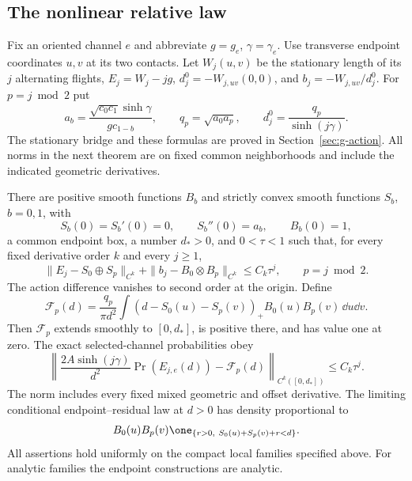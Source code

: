 \subsection{The nonlinear relative law}
Fix an oriented channel $e$ and abbreviate $g=g_e$, $\gamma=\gamma_e$.
Use transverse endpoint coordinates $u,v$ at its two contacts. Let
$W_j(u,v)$ be the stationary length of its $j$ alternating flights,
$E_j=W_j-jg$, $d_j^0=-W_{j,uv}(0,0)$, and $b_j=-W_{j,uv}/d_j^0$.
For $p=j\bmod2$ put
\[
 a_b=\frac{\sqrt{c_0c_1}\sinh\gamma}{g c_{1-b}},\qquad
 q_p=\sqrt{a_0a_p},\qquad d_j^0=\frac{q_p}{\sinh(j\gamma)}.
\]
The stationary bridge and these formulas are proved in
Section~\ref{sec:g-action}. All norms in the next theorem are on fixed
common neighborhoods and include the indicated geometric derivatives.

\begin{theorem}\label{thm:v8-main-relative}
There are positive smooth functions $B_b$ and strictly convex smooth
functions $S_b$, $b=0,1$, with
\[
 S_b(0)=S_b'(0)=0,\qquad S_b''(0)=a_b,\qquad B_b(0)=1,
\]
a common endpoint box, a number $d_*>0$, and $0<\tau<1$ such that,
for every fixed derivative order $k$ and every $j\ge1$,
\begin{equation}\label{eq:v8-relative}
 \|E_j-S_0\oplus S_p\|_{C^k}
 +\|b_j-B_0\otimes B_p\|_{C^k}\le C_k\tau^j,
                    \qquad p=j\bmod2.
\end{equation}
The action difference vanishes to second order at the origin. Define
\begin{equation}\label{eq:v8-boundary-integral}
 \mathcal F_p(d)=\frac{q_p}{\pi d^2}
  \int(d-S_0(u)-S_p(v))_+B_0(u)B_p(v)\,\dd u\dd v.
\end{equation}
Then $\mathcal F_p$ extends smoothly to $[0,d_*]$, is positive there,
and has value one at zero. The exact selected-channel probabilities obey
\begin{equation}\label{eq:v8-relative-integral}
 \left\|\frac{2A\sinh(j\gamma)}{d^2}
           \Pr(E_{j,e}(d))-\mathcal F_p(d)\right\|_{C^k([0,d_*])}
                                  \le C_k\tau^j.
\end{equation}
The norm includes every fixed mixed geometric and offset derivative.
The limiting conditional endpoint--residual law at $d>0$ has density
proportional to
\[
 B_0(u)B_p(v)\one_{\{r>0,\ S_0(u)+S_p(v)+r<d\}}.
\]
All assertions hold uniformly on the compact local families specified
above. For analytic families the endpoint constructions are analytic.
\end{theorem}

